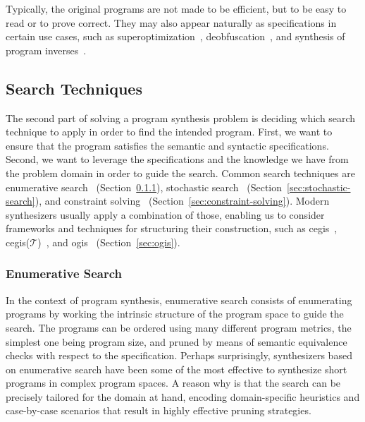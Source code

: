 Typically, the original programs are not made to be efficient, but to be easy to
read or to prove correct.
They may also appear naturally as specifications in certain use cases, such as
superoptimization~\cite{Phothilimthana:2016:SUS},
deobfuscation~\cite{Jha:oracle:2010}, and
synthesis of program inverses~\cite{Srivastava:2011:PIS}.

\subsection{Search Techniques}
\label{sec:search-techniques}

The second part of solving a program synthesis problem is deciding which search
technique to apply in order to find the intended program.
First, we want to ensure that the program satisfies the semantic and syntactic
specifications.
Second, we want to leverage the specifications and the knowledge we have from
the problem domain in order to guide the search.
Common search techniques are
enumerative search~\cite{Phothilimthana:2016:SUS,Alur:2017:SEP}
(Section~\ref{sec:enumerative-search}),
stochastic search~\cite{Schkufza:2013:SS,Singh:ranking:2015}
(Section~\ref{sec:stochastic-search}), and
constraint solving~\cite{Feng:2018:PSU,Feng:2017:CST,Feng:2017:CSC}
(Section~\ref{sec:constraint-solving}).
Modern synthesizers usually apply a combination of those, enabling us to
consider frameworks and techniques for structuring their construction, such as
\gls{cegis}~\cite{Solar-Lezama:2008},
\gls{cegis}($\mathcal{T}$)~\cite{Abate:2018:CMT}, and
\gls{ogis}~\cite{Jha:2017:TFS}
(Section~\ref{sec:ogis}).


\subsubsection{Enumerative Search}
\label{sec:enumerative-search}

In the context of program synthesis, enumerative search consists of enumerating
programs by working the intrinsic structure of the program space to guide the
search.
The programs can be ordered using many different program metrics, the simplest
one being program size, and pruned by means of semantic equivalence checks with
respect to the specification.
Perhaps surprisingly, synthesizers based on enumerative search have been some of
the most effective to synthesize short programs in complex program spaces.
A reason why is that the search can be precisely tailored for the domain at
hand, encoding domain-specific heuristics and case-by-case scenarios that
result in highly effective pruning strategies.

